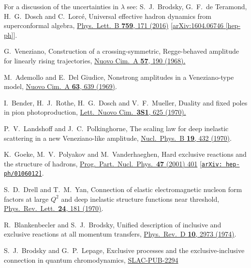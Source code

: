 \documentclass[aps,prl,reprint,groupedaddress, preprintnumbers]{revtex4-1}
\begin{document}
\begin{thebibliography}{50}
  
 For a discussion of the uncertainties in $\lambda$ see:
  S.~J.~Brodsky, G.~F.~de Teramond, H.~G.~Dosch and C.~Lorc\'e,
  Universal effective hadron dynamics from superconformal algebra,
  \href{https://www.sciencedirect.com/science/article/pii/S0370269316302155?via%3Dihub}{Phys.\ Lett.\ B {\bf 759}, 171 (2016)}
  [\href{https://arxiv.org/abs/1604.06746}{arXiv:1604.06746 [hep-ph]}].
  
  
 G.~Veneziano,
 Construction of a crossing-symmetric, Regge-behaved amplitude for linearly rising trajectories,
 \href{https://doi.org/10.1007/BF02824451}{Nuovo Cim.\ A {\bf 57}, 190 (1968).} 
 
 
  M.~Ademollo and E.~Del Giudice,
  Nonstrong amplitudes in a Veneziano-type model,
  \href{https://doi.org/10.1007/BF02756239}{Nuovo Cim.\ A {\bf 63}, 639  (1969)}.
  
  
  I.~Bender, H.~J.~Rothe, H.~G.~Dosch and V.~F.~Mueller,
  Duality and fixed poles in pion photoproduction,
 \href{https://doi.org/10.1007/BF02755475}{Lett.\ Nuovo Cim.\  {\bf 3S1}, 625 (1970).}


  P.~V.~Landshoff and J.~C.~Polkinghorne,
  The scaling law for deep inelastic scattering in a new Veneziano-like amplitude,
  \href{https://doi.org/10.1016/0550-3213(70)90359-7}{Nucl.\ Phys.\ B {\bf 19}, 432 (1970)}.
  
 
  K.~Goeke, M.~V.~Polyakov and M.~Vanderhaeghen,
  Hard exclusive reactions and the structure of hadrons,
  \href{https://doi.org/10.1016/S0146-6410(01)00158-2}{Prog.\ Part.\ Nucl.\ Phys.\  {\bf 47} (2001) 401}
  [\href{https://arxiv.org/abs/hep-ph/0106012}{\tt arXiv: hep-ph/0106012]}.
  
 
  S.~D.~Drell and T.~M.~Yan,
  Connection of elastic electromagnetic nucleon form factors at large $Q^2$ and deep inelastic structure functions near threshold,
  \href{https://doi.org/10.1103/PhysRevLett.24.181}{Phys.\ Rev.\ Lett.\  {\bf 24}, 181 (1970)}.
  
   
  R.~Blankenbecler and S.~J.~Brodsky,
  Unified description of inclusive and exclusive reactions at all momentum transfers,
  \href{https://doi.org/10.1103/PhysRevD.10.2973}{Phys.\ Rev.\ D {\bf 10}, 2973 (1974)}.
  
  
  S.~J.~Brodsky and G.~P.~Lepage,
  Exclusive processes and the exclusive-inclusive connection in quantum chromodynamics,
  \href{http://www-public.slac.stanford.edu/sciDoc/docMeta.aspx?slacPubNumber=SLAC-PUB-2294}{SLAC-PUB-2294}
  

\end{thebibliography}
\end{document}
